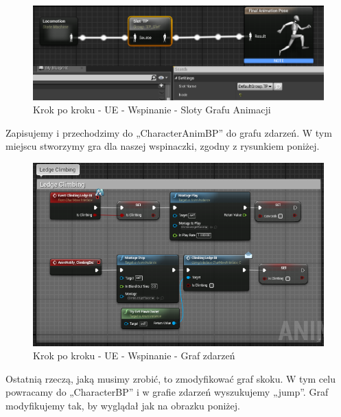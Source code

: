 \documentclass[12pt]{xmgr}
\begin{document}
\begin{figure}[!htb]
    \begin{center}
    \includegraphics[scale=0.5]{Screeny/UeKrokPoKroku/AnimGraphSlot}
    \end{center}
    \caption{Krok po kroku - UE - Wspinanie - Sloty Grafu Animacji}
\end{figure}
\newpage
Zapisujemy i przechodzimy do „CharacterAnimBP” do grafu zdarzeń. W tym miejscu stworzymy gra dla naszej wspinaczki, zgodny z rysunkiem poniżej.

\begin{figure}[!htb]
    \begin{center}
    \includegraphics[scale=0.5]{Screeny/UeKrokPoKroku/LedgeClimbingGraph}
    \end{center}
    \caption{Krok po kroku - UE - Wspinanie - Graf zdarzeń}
\end{figure}

Ostatnią rzeczą, jaką musimy zrobić, to zmodyfikować graf skoku. W tym celu powracamy do „CharacterBP” i w grafie zdarzeń wyszukujemy „jump”. Graf modyfikujemy tak, by wyglądał jak na obrazku poniżej.
\end{document}
